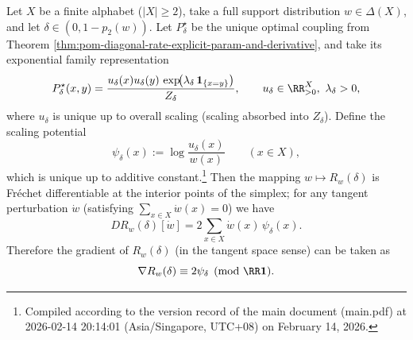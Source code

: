 \begin{theorem}\label{thm:pom-diagonal-rate-frechet-derivative-scaling-potential}
Let \(X\) be a finite alphabet (\(|X|\ge 2\)), take a full support distribution \(w\in\Delta(X)\), and let \(\delta\in(0,1-p_2(w))\).
Let \(P^\star_\delta\) be the unique optimal coupling from Theorem \ref{thm:pom-diagonal-rate-explicit-param-and-derivative}, and take its exponential family representation
\[
P^\star_\delta(x,y)=\frac{u_\delta(x)u_\delta(y)\,\exp\!\bigl(\lambda_\delta\,\mathbf 1_{\{x=y\}}\bigr)}{Z_\delta},
\qquad
u_\delta\in\RR_{>0}^{X},\ \lambda_\delta>0,
\]
where \(u_\delta\) is unique up to overall scaling (scaling absorbed into \(Z_\delta\)).
Define the scaling potential
\[
\psi_\delta(x):=\log\frac{u_\delta(x)}{w(x)}\qquad(x\in X),
\]
which is unique up to additive constant.\footnote{Compiled according to the version record of the main document (main.pdf) at 2026-02-14 20:14:01 (Asia/Singapore, UTC+08) on February 14, 2026.}
Then the mapping \(w\mapsto R_w(\delta)\) is Fr\'echet differentiable at the interior points of the simplex; for any tangent perturbation \(\dot w\) (satisfying \(\sum_{x\in X}\dot w(x)=0\)) we have
\[
DR_w(\delta)[\dot w]=2\sum_{x\in X}\dot w(x)\,\psi_\delta(x).
\]
Therefore the gradient of \(R_w(\delta)\) (in the tangent space sense) can be taken as
\[
\nabla R_w(\delta)\equiv 2\psi_\delta\pmod{\RR\mathbf 1}.
\]
\end{theorem}
